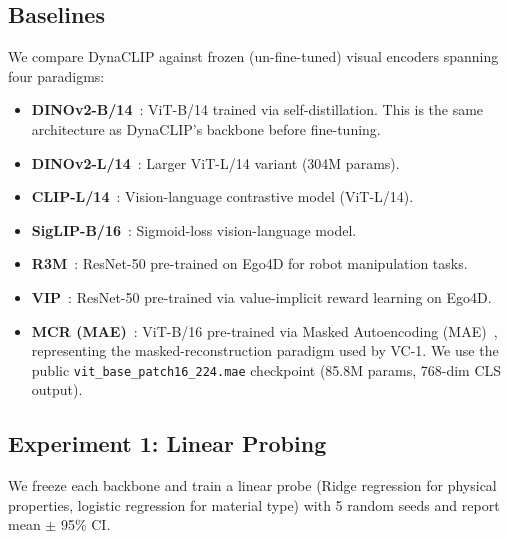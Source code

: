 \documentclass{article}
\newcommand{\methodname}{DynaCLIP}
\begin{document}
\subsection{Baselines}
\label{sec:baselines}

We compare \methodname{} against frozen (un-fine-tuned) visual encoders spanning four paradigms:
\begin{itemize}
    \item \textbf{DINOv2-B/14}~\cite{oquab2024dinov2}: ViT-B/14 trained via self-distillation. This is the same architecture as \methodname{}'s backbone before fine-tuning.
    \item \textbf{DINOv2-L/14}~\cite{oquab2024dinov2}: Larger ViT-L/14 variant (304M params).
    \item \textbf{CLIP-L/14}~\cite{radford2021clip}: Vision-language contrastive model (ViT-L/14).
    \item \textbf{SigLIP-B/16}~\cite{zhai2023siglip}: Sigmoid-loss vision-language model.
    \item \textbf{R3M}~\cite{nair2022r3m}: ResNet-50 pre-trained on Ego4D for robot manipulation tasks.
    \item \textbf{VIP}~\cite{ma2022vip}: ResNet-50 pre-trained via value-implicit reward learning on Ego4D.
    \item \textbf{MCR (MAE)}~\cite{radosavovic2023vc1}: ViT-B/16 pre-trained via Masked Autoencoding (MAE)~\cite{he2022mae}, representing the masked-reconstruction paradigm used by VC-1. We use the public \texttt{vit\_base\_patch16\_224.mae} checkpoint (85.8M params, 768-dim CLS output).
\end{itemize}


\subsection{Experiment 1: Linear Probing}
\label{sec:exp1}

We freeze each backbone and train a linear probe (Ridge regression for physical properties, logistic regression for material type) with 5 random seeds and report mean $\pm$ 95\% CI.
\end{document}
